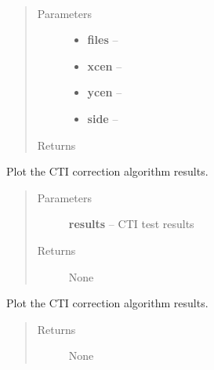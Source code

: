 \documentclass[a4paper,11pt,english]{sphinxmanual}
\begin{document}
\begin{fulllineitems}
\label{reduction:analysis.testCTIcorrection.cutoutRegions}~\begin{quote}\begin{description}
\item[{Parameters}] \leavevmode\begin{itemize}
\item {} 
\textbf{files} -- 

\item {} 
\textbf{xcen} -- 

\item {} 
\textbf{ycen} -- 

\item {} 
\textbf{side} -- 

\end{itemize}

\item[{Returns}] \leavevmode


\end{description}\end{quote}

\end{fulllineitems}


\begin{fulllineitems}
\label{reduction:analysis.testCTIcorrection.plotResults}
Plot the CTI correction algorithm results.
\begin{quote}\begin{description}
\item[{Parameters}] \leavevmode
\textbf{results} -- CTI test results

\item[{Returns}] \leavevmode
None

\end{description}\end{quote}

\end{fulllineitems}


\begin{fulllineitems}
\label{reduction:analysis.testCTIcorrection.plotResultsNoNoise}
Plot the CTI correction algorithm results.
\begin{quote}\begin{description}
\item[{Returns}] \leavevmode
None

\end{description}\end{quote}

\end{fulllineitems}
\end{document}

